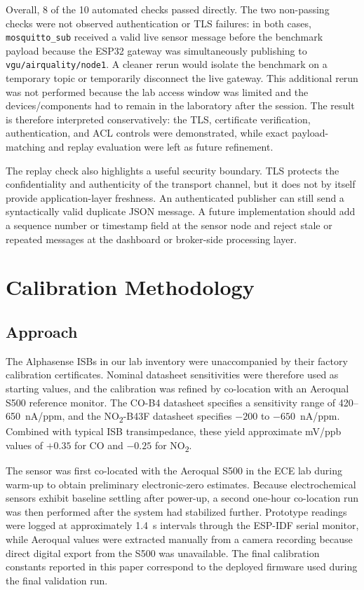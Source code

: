 \documentclass[conference]{IEEEtran}
\begin{document}
Overall, 8 of the 10 automated checks passed directly. The two non-passing checks were not observed authentication or TLS failures: in both cases, \texttt{mosquitto\_sub} received a valid live sensor message before the benchmark payload because the ESP32 gateway was simultaneously publishing to \texttt{vgu/airquality/node1}. A cleaner rerun would isolate the benchmark on a temporary topic or temporarily disconnect the live gateway. This additional rerun was not performed because the lab access window was limited and the devices/components had to remain in the laboratory after the session. The result is therefore interpreted conservatively: the TLS, certificate verification, authentication, and ACL controls were demonstrated, while exact payload-matching and replay evaluation were left as future refinement.

The replay check also highlights a useful security boundary. TLS protects the confidentiality and authenticity of the transport channel, but it does not by itself provide application-layer freshness. An authenticated publisher can still send a syntactically valid duplicate JSON message. A future implementation should add a sequence number or timestamp field at the sensor node and reject stale or repeated messages at the dashboard or broker-side processing layer.

\section{Calibration Methodology}

\subsection{Approach}
The Alphasense ISBs in our lab inventory were unaccompanied by their factory calibration certificates. Nominal datasheet sensitivities were therefore used as starting values, and the calibration was refined by co-location with an Aeroqual S500 reference monitor. The CO-B4 datasheet specifies a sensitivity range of 420--650~nA/ppm, and the NO\textsubscript{2}-B43F datasheet specifies $-200$ to $-650$~nA/ppm. Combined with typical ISB transimpedance, these yield approximate mV/ppb values of $+0.35$ for CO and $-0.25$ for NO\textsubscript{2}.

The sensor was first co-located with the Aeroqual S500 in the ECE lab during warm-up to obtain preliminary electronic-zero estimates. Because electrochemical sensors exhibit baseline settling after power-up, a second one-hour co-location run was then performed after the system had stabilized further. Prototype readings were logged at approximately 1.4~s intervals through the ESP-IDF serial monitor, while Aeroqual values were extracted manually from a camera recording because direct digital export from the S500 was unavailable. The final calibration constants reported in this paper correspond to the deployed firmware used during the final validation run.
\end{document}
